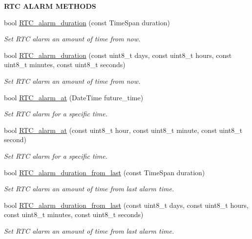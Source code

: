 \begin{Indent}{\bf R\+TC A\+L\+A\+RM M\+E\+T\+H\+O\+DS}\par
\begin{DoxyCompactItemize}
\item 
bool \hyperlink{class_loom___interrupt___manager_ac188b3f03d32bcfdfe5caf4eae31f33d}{R\+T\+C\+\_\+alarm\+\_\+duration} (const Time\+Span duration)
\begin{DoxyCompactList}\small\item\em Set R\+TC alarm an amount of time from now. \end{DoxyCompactList}\item 
bool \hyperlink{class_loom___interrupt___manager_abde5c47ed6021fe7280c14891b1a1c31}{R\+T\+C\+\_\+alarm\+\_\+duration} (const uint8\+\_\+t days, const uint8\+\_\+t hours, const uint8\+\_\+t minutes, const uint8\+\_\+t seconds)
\begin{DoxyCompactList}\small\item\em Set R\+TC alarm an amount of time from now. \end{DoxyCompactList}\item 
bool \hyperlink{class_loom___interrupt___manager_afca2eade7f1520c97add8dbffe1247df}{R\+T\+C\+\_\+alarm\+\_\+at} (Date\+Time future\+\_\+time)
\begin{DoxyCompactList}\small\item\em Set R\+TC alarm for a specific time. \end{DoxyCompactList}\item 
bool \hyperlink{class_loom___interrupt___manager_abbfb010ec889658a10d596ac4d096069}{R\+T\+C\+\_\+alarm\+\_\+at} (const uint8\+\_\+t hour, const uint8\+\_\+t minute, const uint8\+\_\+t second)
\begin{DoxyCompactList}\small\item\em Set R\+TC alarm for a specific time. \end{DoxyCompactList}\item 
bool \hyperlink{class_loom___interrupt___manager_aef46cb9e0c3aee294ef5eacd5685be72}{R\+T\+C\+\_\+alarm\+\_\+duration\+\_\+from\+\_\+last} (const Time\+Span duration)
\begin{DoxyCompactList}\small\item\em Set R\+TC alarm an amount of time from last alarm time. \end{DoxyCompactList}\item 
bool \hyperlink{class_loom___interrupt___manager_a254c240e87b74e465acb4ed36e9fc2b8}{R\+T\+C\+\_\+alarm\+\_\+duration\+\_\+from\+\_\+last} (const uint8\+\_\+t days, const uint8\+\_\+t hours, const uint8\+\_\+t minutes, const uint8\+\_\+t seconds)
\begin{DoxyCompactList}\small\item\em Set R\+TC alarm an amount of time from last alarm time. \end{DoxyCompactList}\end{DoxyCompactItemize}
\end{Indent}
